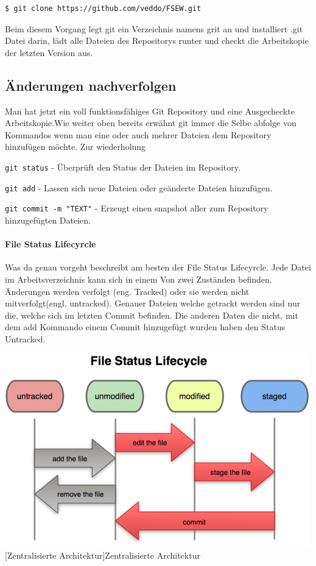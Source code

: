 \documentclass[12pt,a4paper,bibliography=totocnumbered,listof=totocnumbered]{scrartcl}
\begin{document}
    \vspace{1em}
\begin{lstlisting}[caption=Git Repository Klonen, label=lst:arduino]
$ git clone https://github.com/veddo/FSEW.git
\end{lstlisting}

Beim diesem Vorgang legt git ein Verzeichnis namens grit an und installiert .git Datei darin, lädt alle Dateien des Repositorys runter und checkt die Arbeitskopie der letzten Version aus.




\subsection{ Änderungen nachverfolgen}
 Man hat jetzt ein voll funktionsfähiges Git Repository und eine Ausgecheckte Arbeitskopie.Wie weiter oben bereits erwähnt git immer die Selbe abfolge von Kommandos wenn man eine oder auch mehrer Dateien dem Repository hinzufügen möchte. Zur wiederholung
\begin{compactitem}
	\item \lstinline|git status| - Überprüft den Status der Dateien im Repository.
	\item \lstinline|git add| - Lassen sich neue Dateien oder geänderte Dateien hinzufügen. 
	\item \lstinline|git commit -m "TEXT"| - Erzeugt einen snapshot aller zum Repository hinzugefügten Dateien.
\end{compactitem}
\paragraph{File Status Lifecyrcle}
Was da genau vorgeht beschreibt am besten der File Status Lifecyrcle. Jede Datei im Arbeitsverzeichnis kann sich in einem Von zwei Zuständen befinden. Änderungen werden verfolgt (eng. Tracked) oder sie werden nicht mitverfolgt(engl. untracked). 
Genauer Dateien welche getrackt werden sind nur die, welche sich im letzten Commit befinden. Die anderen Daten die nicht, mit dem add Kommando einem Commit hinzugefügt wurden haben den Status Untracked. \newline


\newline
\newline
\vspace{1em}
\begin{minipage}{\linewidth}
	\centering
	\includegraphics[width=0.6\linewidth]{Bilder/flc.png}
	[Zentralisierte Architektur]{Zentralisierte Architektur\footnotemark }
	\label{fig:osgi}
\end{minipage} 	
\end{document}
